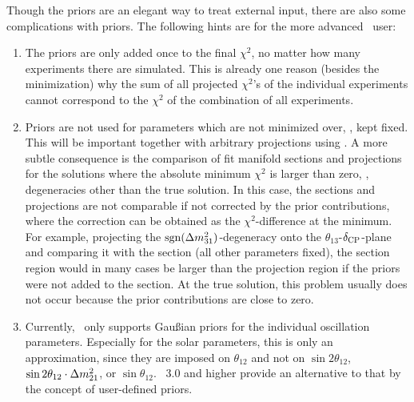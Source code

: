 Though the priors are an elegant way to treat external input, 
there are also some complications with priors. The following hints are for the
more advanced \GLOBES\ user:
\begin{enumerate}
\item
 The priors are only added once to the final $\chi^2$, no matter how
 many experiments there are simulated. This is already one reason
 (besides the minimization) why the sum of all projected $\chi^2$'s of 
 the individual experiments 
 cannot correspond to the $\chi^2$ of the combination of all experiments.
\item
 Priors are not used for parameters which are not minimized over, \ie, 
 kept fixed. This will be important together with arbitrary projections
 using . A more subtle consequence is the comparison
 of fit manifold sections and projections for the solutions where
 the absolute minimum $\chi^2$ is larger than zero, \ie, degeneracies
 other than the true solution. In this case, the sections and
 projections are not  comparable if not corrected by the prior contributions, where the
 correction can be obtained as the $\chi^2$-difference at the minimum.
 For example, projecting the $\mathrm{sgn}(\Delta m_{31}^2)$-degeneracy onto
 the $\theta_{13}$-$\delta_{\mathrm{CP}}$-plane and comparing it with the section
 (all other parameters fixed), the section region would in many cases be 
 larger than the projection region if the priors were not added to the
 section. At the true solution, this problem usually does not occur
 because the prior contributions are close to zero.    
\item
Currently, \GLOBES\ only supports Gau\ss ian priors for the individual
oscillation parameters. Especially for the solar parameters, this is only
 an approximation, since they are imposed on $\theta_{12}$ and not
 on $\sin 2 \theta_{12}$, $\sin 2 \theta_{12} \cdot \Delta m_{21}^2$, or $\sin  
 \theta_{12}$. \GLOBES\ 3.0 and higher provide an alternative
to that by the concept of user-defined priors.
 \end{enumerate}

 
 

